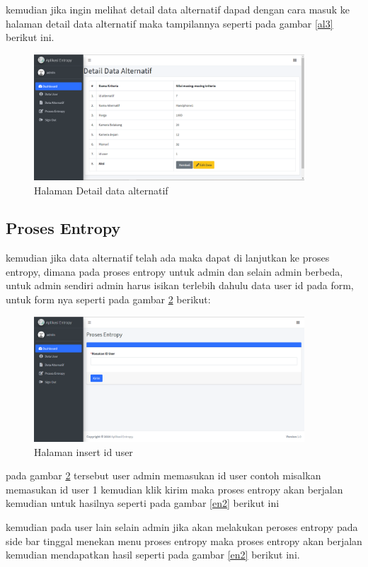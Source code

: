 kemudian jika ingin melihat detail data alternatif dapad dengan cara masuk ke halaman detail data alternatif maka tampilannya seperti pada gambar \ref{al3} berikut ini.
\begin{figure}[!htbp]
	\centerline{\includegraphics[width=0.90\textwidth]{figures/alte/5.png}}
	\caption{Halaman Detail data alternatif}
	\label{al5}
\end{figure}
\pagebreak
\subsection{Proses Entropy}
	kemudian jika data alternatif telah ada maka dapat di lanjutkan ke proses entropy, dimana pada proses entropy untuk admin dan selain admin berbeda, untuk admin sendiri admin harus isikan terlebih dahulu data user id pada form, untuk form nya seperti pada gambar \ref{en1} berikut:
\begin{figure}[!htbp]
	\centerline{\includegraphics[width=0.90\textwidth]{figures/en/1.png}}
	\caption{Halaman insert id user}
	\label{en1}
\end{figure}

pada gambar \ref{en1} tersebut user admin memasukan id user contoh misalkan memasukan id user 1 kemudian klik kirim maka proses entropy akan berjalan kemudian untuk hasilnya seperti pada gambar \ref{en2} berikut ini
\pagebreak

kemudian pada user lain selain admin jika akan melakukan peroses entropy pada side bar tinggal menekan menu proses entropy maka proses entropy akan berjalan kemudian mendapatkan hasil seperti pada gambar \ref{en2} berikut ini.

